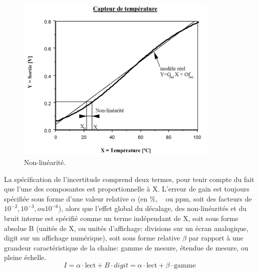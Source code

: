 \begin{center}
\end{center}

\begin{figure}
    \centering
    \includegraphics[height=8cm]{assets/figures/3_1_Non_Linearite.PNG}
    \caption{Non-linéarité.}
    \label{fig:Non-linéarité}
\end{figure}
La spécification de l'incertitude comprend deux termes, pour tenir compte du fait que l'une des composantes est proportionnelle à X. L'erreur de gain est toujours spécifiée sous forme d'une valeur relative $\alpha$ (en \%, \textperthousand ~ ou ppm, soit des facteurs de $10^{-2}, 10^{-3}, ou 10^{-6}$), alors que l'effet global du décalage, des non-linéarités et du bruit interne est spécifié comme un terme indépendant de X, soit sous forme absolue B (unités de X, ou unités d'affichage: divisions sur un écran analogique, digit sur un affichage numérique), soit sous forme relative $\beta$ par rapport à une grandeur caractéristique de la chaîne: gamme de mesure, étendue de mesure, ou pleine échelle.
\begin{equation}
    I = \alpha \cdot \text{lect} + B \cdot digit = \alpha \cdot \text{lect} + \beta \cdot \text{gamme}
\end{equation}

